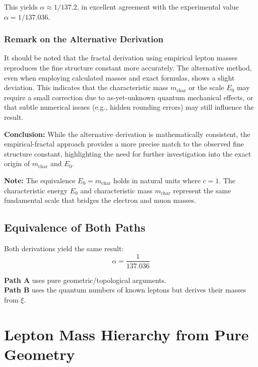 \documentclass[12pt,a4paper]{article}
\newcommand{\xipar}{\xi}  %
\begin{document}
This yields $\alpha \approx 1/137.2$, in excellent agreement with the experimental value $\alpha = 1/137.036$.

\subsubsection*{Remark on the Alternative Derivation}

It should be noted that the fractal derivation using empirical lepton masses reproduces the fine structure constant more accurately. The alternative method, even when employing calculated masses and exact formulas, shows a slight deviation. This indicates that the characteristic mass $m_{\text{char}}$ or the scale $E_0$ may require a small correction due to as-yet-unknown quantum mechanical effects, or that subtle numerical issues (e.g., hidden rounding errors) may still influence the result. 

\textbf{Conclusion:} While the alternative derivation is mathematically consistent, the empirical-fractal approach provides a more precise match to the observed fine structure constant, highlighting the need for further investigation into the exact origin of $m_{\text{char}}$ and $E_0$.

\textbf{Note:} The equivalence $E_0 = m_{\text{char}}$ holds in natural units where $c = 1$. The characteristic energy $E_0$ and characteristic mass $m_{\text{char}}$ represent the same fundamental scale that bridges the electron and muon masses.
	\subsection{Equivalence of Both Paths}
	
	Both derivations yield the same result:
	\begin{equation}
		\boxed{\alpha = \frac{1}{137.036}}
	\end{equation}
	
	\textbf{Path A} uses pure geometric/topological arguments.\\
	\textbf{Path B} uses the quantum numbers of known leptons but derives their masses from $\xipar$.
	
	\section{Lepton Mass Hierarchy from Pure Geometry}
	
\end{document}
